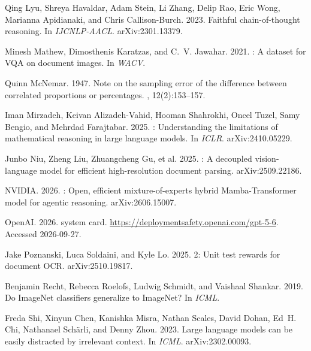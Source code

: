 \documentclass[11pt]{article}%
\begin{document}
\begin{thebibliography}{}
Qing Lyu, Shreya Havaldar, Adam Stein, Li Zhang, Delip Rao, Eric Wong,
  Marianna Apidianaki, and Chris Callison-Burch. 2023.
\newblock Faithful chain-of-thought reasoning.
\newblock In {\em IJCNLP-AACL}. arXiv:2301.13379.

Minesh Mathew, Dimosthenis Karatzas, and C.~V. Jawahar. 2021.
: A dataset for {VQA} on document images.
\newblock In {\em WACV}.

Quinn McNemar. 1947.
\newblock Note on the sampling error of the difference between correlated
  proportions or percentages.
, 12(2):153--157.

Iman Mirzadeh, Keivan Alizadeh-Vahid, Hooman Shahrokhi, Oncel Tuzel, Samy Bengio, and
  Mehrdad Farajtabar. 2025.
: Understanding the limitations of mathematical
  reasoning in large language models.
\newblock In {\em ICLR}. arXiv:2410.05229.

Junbo Niu, Zheng Liu, Zhuangcheng Gu, et al. 2025.
: A decoupled vision-language model for efficient
  high-resolution document parsing.
\newblock arXiv:2509.22186.

NVIDIA. 2026.
: Open, efficient mixture-of-experts hybrid
  {Mamba-Transformer} model for agentic reasoning.
\newblock arXiv:2606.15007.

OpenAI. 2026.
 system card.
\newblock \url{https://deploymentsafety.openai.com/gpt-5-6}. Accessed 2026-09-27.

Jake Poznanski, Luca Soldaini, and Kyle Lo. 2025.
 2: Unit test rewards for document {OCR}.
\newblock arXiv:2510.19817.

Benjamin Recht, Rebecca Roelofs, Ludwig Schmidt, and Vaishaal Shankar. 2019.
\newblock Do {ImageNet} classifiers generalize to {ImageNet}?
\newblock In {\em ICML}.

Freda Shi, Xinyun Chen, Kanishka Misra, Nathan Scales, David Dohan, Ed~H. Chi,
  Nathanael Sch{\"a}rli, and Denny Zhou. 2023.
\newblock Large language models can be easily distracted by irrelevant
  context.
\newblock In {\em ICML}. arXiv:2302.00093.


\end{thebibliography}
\end{document}
